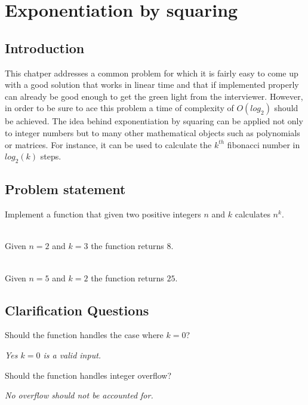 %

\chapter{Exponentiation by squaring}
\label{ch:exponentiation}
\section*{Introduction}
This chatper addresses a common problem for which it is fairly easy to come up with a good solution that works in linear time and that if implemented properly can already be good enough to get the green light from the interviewer. However, in order to be sure to ace this problem a time of complexity of  $O(log_2)$ should be achieved.
The idea behind exponentiation by squaring can be applied not only to integer numbers but to many other mathematical objects such as polynomials or matrices. For instance, it can be used to calculate the $k^{th}$ fibonacci number in $log_2(k)$ steps. 

\section{Problem statement}
\begin{exercise}
Implement a function that given two positive integers $n$ and $k$ calculates $n^k$.
\end{exercise}


\begin{example}
	\hfill \\
	Given $n=2$ and $k=3$ the function returns $8$.
\end{example}

\begin{example}
	\hfill \\
	Given $n=5$ and $k=2$ the function returns $25$.
\end{example}

\section{Clarification Questions}

\begin{QandA}
	\item Should the function handles the case where $k=0$?
	\begin{answered}
		\textit{Yes $k=0$ is a valid input.}
	\end{answered}
	
	\item Should the function handles integer overflow?
	\begin{answered}
		\textit{No overflow should not be accounted for. }
	\end{answered}
		
\end{QandA}

